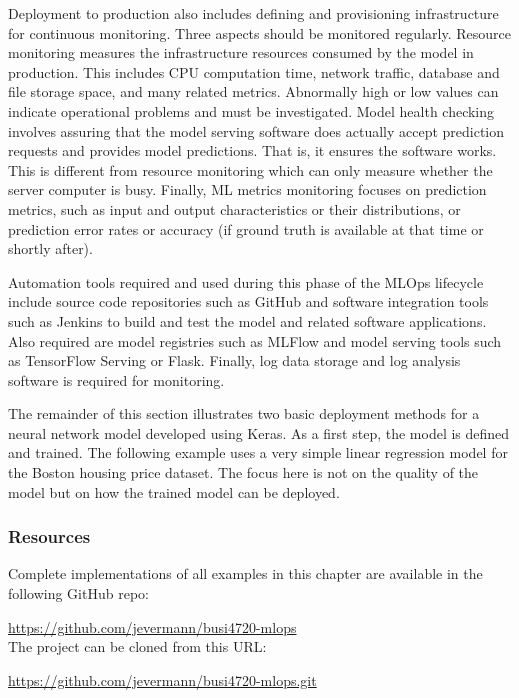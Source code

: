 Deployment to production also includes defining and provisioning infrastructure for continuous monitoring. Three aspects should be monitored regularly. Resource monitoring measures the infrastructure resources consumed by the model in production. This includes CPU computation time, network traffic, database and file storage space, and many related metrics. Abnormally high or low values can indicate operational problems and must be investigated. Model health checking involves assuring that the model serving software does actually accept prediction requests and provides model predictions. That is, it ensures the software works. This is different from resource monitoring which can only measure whether the server computer is busy. Finally, ML metrics monitoring focuses on prediction metrics, such as input and output characteristics or their distributions, or prediction error rates or accuracy (if ground truth is available at that time or shortly after). 

Automation tools required and used during this phase of the MLOps lifecycle include source code repositories such as GitHub and software integration tools such as Jenkins to build and test the model and related software applications. Also required are model registries such as MLFlow and model serving tools such as TensorFlow Serving or Flask. Finally, log data storage and log analysis software is required for monitoring. 

The remainder of this section illustrates two basic deployment methods for a neural network model developed using Keras. As a first step, the model is defined and trained. The following example uses a very simple linear regression model for the Boston housing price dataset. The focus here is not on the quality of the model but on how the trained model can be deployed. 

\begin{tcolorbox}[colback=alert]
\subsubsection*{Resources}
Complete implementations of all examples in this chapter are available in the following GitHub repo:

\url{https://github.com/jevermann/busi4720-mlops} \\

The project can be cloned from this URL:

\url{https://github.com/jevermann/busi4720-mlops.git}
\end{tcolorbox}


